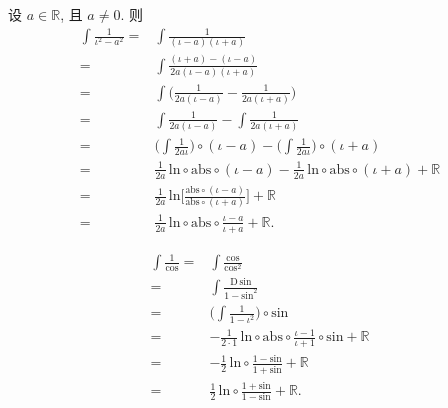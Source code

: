 \begin{example}
    设 $a \in \mathbb{R}$, 且 $a \neq 0$. 则
    \begin{align*}
        \int {\frac{1}{\iota^2 - a^2}}
        = {} & \int {\frac{1}{(\iota - a)(\iota + a)}}                                \\
        = {} & \int {\frac{(\iota + a) - (\iota - a)}{2a(\iota - a)(\iota + a)}}      \\
        = {} & \int {\Bigg( \frac{1}{2a(\iota - a)} - \frac{1}{2a(\iota + a)} \Bigg)} \\
        = {} & \int {\frac{1}{2a(\iota - a)}} - \int {\frac{1}{2a(\iota + a)}}        \\
        = {} & \Bigg(\int {\frac{1}{2a\iota}}\Bigg) \circ (\iota - a)
        - \Bigg(\int {\frac{1}{2a\iota}}\Bigg) \circ (\iota + a)                      \\
        = {} & \frac{1}{2a}\,\mathrm{ln} \circ \mathrm{abs} \circ (\iota - a)
        - \frac{1}{2a}\,\mathrm{ln} \circ \mathrm{abs} \circ (\iota + a)
        + \mathbb{R}                                                                  \\
        = {} & \frac{1}{2a}\,\mathrm{ln} \Bigg[ \frac{\mathrm{abs} \circ (\iota - a)}
        {\mathrm{abs} \circ (\iota + a)} \Bigg] + \mathbb{R}                          \\
        = {} & \frac{1}{2a}\,\mathrm{ln} \circ \mathrm{abs} \circ
        \frac{\iota - a}{\iota + a} + \mathbb{R}.
    \end{align*}
\end{example}

\begin{example}
    \begin{align*}
        \int {\frac{1}{\mathrm{cos}}}
        = {} & \int {\frac{\mathrm{cos}}{\mathrm{cos}^2}}                               \\
        = {} & \int {\frac{\mathrm{D}\,\mathrm{sin}}{1 - \mathrm{sin}^2}}               \\
        = {} & \Bigg( \int {\frac{1}{1 - \iota^2}} \Bigg) \circ \mathrm{sin}            \\
        = {} & -\frac{1}{2 \cdot 1}\,\mathrm{ln} \circ \mathrm{abs}
        \circ \frac{\iota - 1}{\iota + 1} \circ \mathrm{sin} + \mathbb{R}               \\
        = {} & -\frac{1}{2}\,\mathrm{ln} \circ
        \frac{1 - \mathrm{sin}}{1 + \mathrm{sin}} + \mathbb{R}                          \\
        = {} & \frac{1}{2}\,\mathrm{ln} \circ \frac{1 + \mathrm{sin}}{1 - \mathrm{sin}}
        + \mathbb{R}.
    \end{align*}
\end{example}

